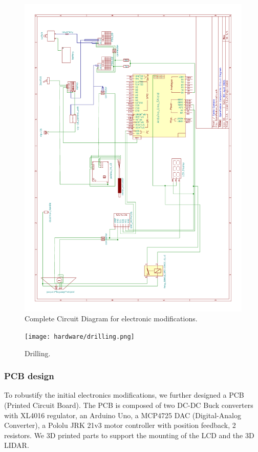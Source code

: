 \documentclass[a4paper]{article}
\begin{document}
\begin{figure}
	\centering
	\includegraphics[width=0.9\linewidth]{hardware/OpenPodcar_Components_Circuit_Diagram_colored.pdf}
	\caption{Complete Circuit Diagram for electronic modifications.}
	\label{fig:CompleteCircuitDiagram}
\end{figure}

\begin{figure}[h]
	\texttt{[image: hardware/drilling.png]}
	\caption{Drilling.}
	\label{fig:drilling}
\end{figure}

\subsubsection{PCB design}

To robustify the initial electronics modifications, we further designed a PCB (Printed Circuit Board). The PCB is composed of two DC-DC Buck converters with XL4016 regulator, an Arduino Uno, a MCP4725 DAC (Digital-Analog Converter), a Pololu JRK 21v3 motor controller with position feedback, 2 resistors. We 3D printed parts to support the mounting of the LCD and the 3D LIDAR.  
\end{document}
